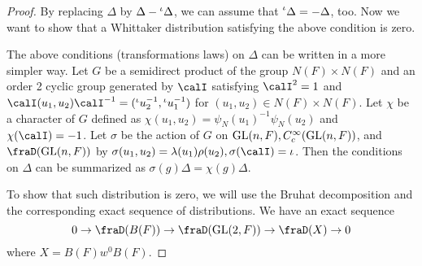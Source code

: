\begin{proof}
By replacing $\Delta$ by $\Delta - \prescript{\iota}{}{}\Delta$, we can assume that $\prescript{\iota}{}\Delta = -\Delta$, too. Now we want to show that a Whittaker distribution satisfying the above condition is zero. 

The above conditions (transformations laws) on $\Delta$ can be written in a more simpler way. Let $G$ be a semidirect product of the group $N(F)\times N(F)$ and an order 2 cyclic group generated by $\calI$ satisfying $\calI^{2} = 1$ and $\calI(u_{1}, u_{2})\calI^{-1} = (\pre{\iota}{}u_{2}^{-1}, \pre{\iota}{}u_{1}^{-1})$ for $(u_{1}, u_{2})\in N(F)\times N(F)$. 
Let $\chi$ be a character of $G$ defined as $\chi(u_{1}, u_{2})= \psi_{N}(u_{1})^{-1}\psi_{N}(u_{2})$ and $\chi(\calI) = -1$. 
Let $\sigma$ be the action of $G$ on $\mathrm{GL}(n, F), C_{c}^{\infty}(\mathrm{GL}(n, F))$, and $\fraD(\GL(n, F))$ by $\sigma(u_{1}, u_{2}) = \lambda(u_{1})\rho(u_{2}), \sigma(\calI) =\iota$. Then the conditions on $\Delta$ can be summarized as $\sigma(g) \Delta = \chi(g)\Delta$. 

To show that such distribution is zero, we will use the Bruhat decomposition and the corresponding exact sequence of distributions. We have an exact sequence
$$
0 \to \fraD(B(F)) \to \fraD(\GL(2, F)) \to \fraD(X) \to 0
$$
where $X = B(F)w^{0}B(F)$. 


\end{proof}
